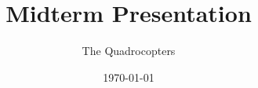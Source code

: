 \documentclass[12pt]{beamer}
\title{Midterm Presentation}
\author{The Quadrocopters}
\institute{Technische Universität München}
\date{\today}
\begin{document}
\begin{frame}
\maketitle
\end{frame}

\begin{frame}
\tableofcontents
\end{frame}

%



%


\cite{Diebel2006}
\cite{buschmann2014}
\cite{Garcia2013}


\end{document}
